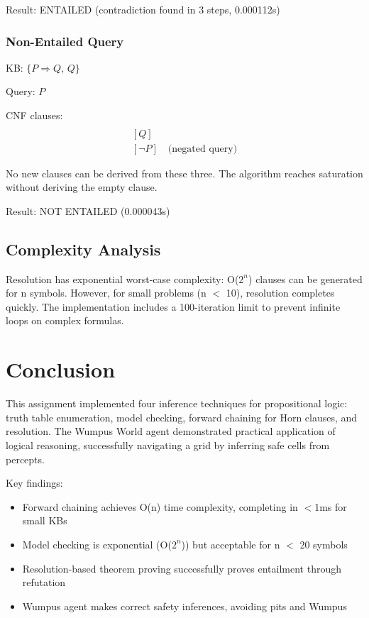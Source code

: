 \documentclass[letterpaper]{article}
\begin{document}
Result: ENTAILED (contradiction found in 3 steps, 0.000112s)

\subsubsection{Non-Entailed Query}

KB: $\{P \Rightarrow Q, \, Q\}$

Query: $P$

CNF clauses:
\begin{align*}
[\neg P, Q] \\
[Q] \\
[\neg P] \quad \text{(negated query)}
\end{align*}

No new clauses can be derived from these three. The algorithm reaches saturation without deriving the empty clause.

Result: NOT ENTAILED (0.000043s)

\subsection{Complexity Analysis}

Resolution has exponential worst-case complexity: O($2^n$) clauses can be generated for n symbols. However, for small problems (n $<$ 10), resolution completes quickly. The implementation includes a 100-iteration limit to prevent infinite loops on complex formulas.

\section{Conclusion}

This assignment implemented four inference techniques for propositional logic: truth table enumeration, model checking, forward chaining for Horn clauses, and resolution. The Wumpus World agent demonstrated practical application of logical reasoning, successfully navigating a grid by inferring safe cells from percepts.

Key findings:
\begin{itemize}
\item Forward chaining achieves O(n) time complexity, completing in $<$1ms for small KBs
\item Model checking is exponential (O($2^n$)) but acceptable for n $<$ 20 symbols
\item Resolution-based theorem proving successfully proves entailment through refutation
\item Wumpus agent makes correct safety inferences, avoiding pits and Wumpus
\end{itemize}
\end{document}
